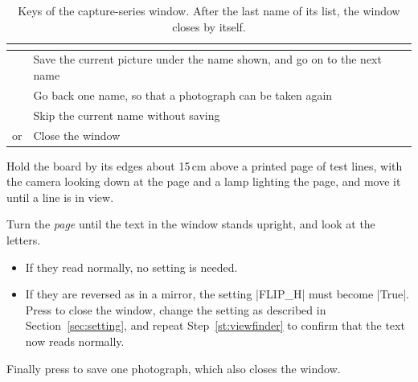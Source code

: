 \begin{table}[H]
\centering
\begin{tabular}{C{2.2cm}L{8.6cm}}
\toprule
{} &  \\
\midrule
{} & Save the current picture under the name shown, and go on to the next name \\
 & Go back one name, so that a photograph can be taken again \\
 & Skip the current name without saving \\
 or  & Close the window \\
\bottomrule
\end{tabular}
\caption{Keys of the capture-series window. After the last name of its list, the window closes
by itself.}
\label{tab:serieskeys}
\end{table}

Hold the board by its edges about 15\,cm above a printed page of test lines, with the camera
looking down at the page and a lamp lighting the page, and move it until a line is in view.

\label{st:orient}
Turn the \emph{page} until the text in the window stands upright, and look at the letters.
\begin{itemize}
\item If they read normally, no setting is needed.
\item If they are reversed as in a mirror, the setting \code|FLIP_H| must become \code|True|.
  Press  to close the window, change the setting as described in
  Section~\ref{sec:setting}, and repeat Step~\ref{st:viewfinder} to confirm that the text now
  reads normally.
\end{itemize}
Finally press  to save one photograph, which also closes the window.


